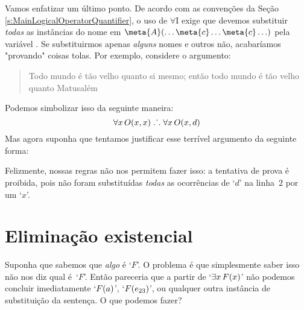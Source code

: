 Vamos enfatizar um \'ultimo ponto. De acordo com as conven\c c\~oes da Se\c c\~ao \ref{s:MainLogicalOperatorQuantifier}, o uso de $\forall$I exige que devemos substituir  \emph{todas} as inst\^ancias do nome  em $\meta{A}(\ldots \meta{c}\ldots\meta{c}\ldots)$ pela vari\'avel . Se substituirmos apenas \emph{alguns} nomes e outros n\~ao, acabar\'iamos "provando" coisas tolas. Por exemplo, considere o argumento:
	\begin{quote}
	Todo mundo \'e t\~ao velho quanto si mesmo; ent\~ao todo mundo \'e t\~ao velho quanto Matusal\'em
	\end{quote}
Podemos simbolizar isso da seguinte maneira:
$$\forall x\,\mathord{O}(x,x) \mathrel{\ldotp\dot{}\,\ldotp} \forall x\,\mathord{O}(x,d)$$
Mas agora suponha que tentamos justificar esse terr\'ivel argumento da seguinte forma:
\begin{fitchproof}
\end{fitchproof}
Felizmente, nossas regras n\~ao nos permitem fazer isso: a tentativa de prova \'e proibida, pois n\~ao foram substituídas \emph{todas} as ocorr\^encias de `$d$' na linha~$2$ por um `$x$'.

\section{Elimina\c c\~ao  existencial}
Suponha que sabemos que \emph{algo}  é `$F$'. O problema \'e que simplesmente saber isso n\~ao nos diz qual \'e~`$F$'. Ent\~ao pareceria que a partir de `$\exists x\,\mathord{F}(x)$' n\~ao podemos concluir imediatamente `$\mathord{F}(a)$', `$\mathord{F}(e_{23})$', ou qualquer outra inst\^ancia de substitui\c c\~ao da senten\c ca. O que podemos fazer?
 
